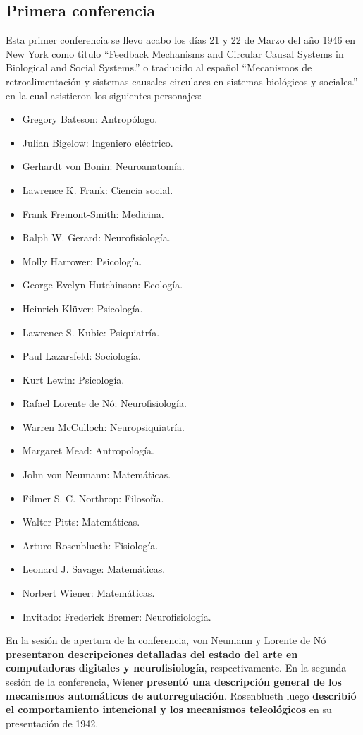 \documentclass[11pt]{article}
\begin{document}
		\subsection{Primera conferencia}
		Esta primer conferencia se llevo acabo los días 21 y 22 de Marzo del año 1946 en New York como titulo ``Feedback Mechanisms and Circular Causal Systems in Biological and Social Systems.'' o traducido al español ``Mecanismos de retroalimentación y sistemas causales circulares en sistemas biológicos y sociales.'' en la cual asistieron los siguientes personajes:
		\begin{itemize}
    		\item Gregory Bateson: Antropólogo. 
    		\item Julian Bigelow: Ingeniero eléctrico.
    		\item Gerhardt von Bonin: Neuroanatomía.
    		\item Lawrence K. Frank: Ciencia social.
    		\item Frank Fremont-Smith: Medicina.
    		\item Ralph W. Gerard: Neurofisiología.
    		\item Molly Harrower: Psicología.
    		\item George Evelyn Hutchinson: Ecología.
    		\item Heinrich Klüver: Psicología.
    		\item Lawrence S. Kubie: Psiquiatría.
    		\item Paul Lazarsfeld: Sociología.
    		\item Kurt Lewin: Psicología.
    		\item Rafael Lorente de Nó: Neurofisiología.
    		\item Warren McCulloch: Neuropsiquiatría.
    		\item Margaret Mead: Antropología.
    		\item John von Neumann: Matemáticas.
    		\item Filmer S. C. Northrop: Filosofía.
    		\item Walter Pitts: Matemáticas.
    		\item Arturo Rosenblueth: Fisiología.
    		\item Leonard J. Savage: Matemáticas.
    		\item Norbert Wiener: Matemáticas.
			\item Invitado: Frederick Bremer: Neurofisiología.
		\end{itemize}
		En la sesión de apertura de la conferencia, von Neumann y Lorente de Nó \textbf{presentaron descripciones detalladas del estado del arte en computadoras digitales y neurofisiología}, respectivamente. En la segunda sesión de la conferencia, Wiener \textbf{presentó una descripción general de los mecanismos automáticos de autorregulación}. Rosenblueth luego \textbf{describió el comportamiento intencional y los mecanismos teleológicos} en su presentación de 1942.\par
\end{document}

